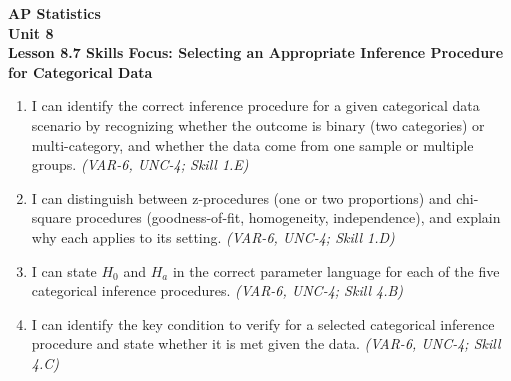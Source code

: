 \documentclass[10pt]{article}
\begin{document}
\vspace{-0.8in}

\begin{center}
  {\color{white}\textbf{\LARGE AP Statistics}}\\[4pt]
  {\color{skymid}\large\textbf{Unit 8}}\\[6pt]
  {\color{white}\textbf{\large Lesson 8.7 \quad Skills Focus: Selecting an Appropriate Inference Procedure for Categorical Data}}
\end{center}

\vspace{0.22in}
\namedateperiod
\vspace{0.18in}

\begin{learningtargetbox}
\small
\begin{enumerate}[leftmargin=1.5em, itemsep=5pt]
  \item I can identify the correct inference procedure for a given categorical data scenario
        by recognizing whether the outcome is binary (two categories) or multi-category, and
        whether the data come from one sample or multiple groups.
        \textit{(VAR-6, UNC-4; Skill 1.E)}
  \item I can distinguish between z-procedures (one or two proportions) and chi-square
        procedures (goodness-of-fit, homogeneity, independence), and explain why each applies
        to its setting.
        \textit{(VAR-6, UNC-4; Skill 1.D)}
  \item I can state $H_0$ and $H_a$ in the correct parameter language for each of the five
        categorical inference procedures.
        \textit{(VAR-6, UNC-4; Skill 4.B)}
  \item I can identify the key condition to verify for a selected categorical inference
        procedure and state whether it is met given the data.
        \textit{(VAR-6, UNC-4; Skill 4.C)}
\end{enumerate}
\end{learningtargetbox}

\vspace{0.14in}
\end{document}
